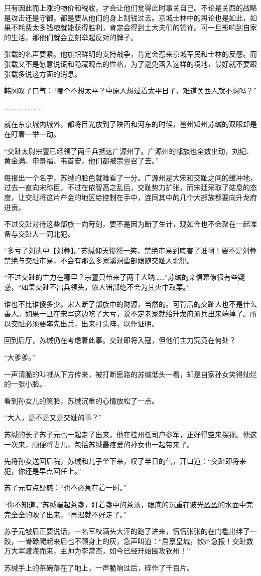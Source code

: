 只有因此而上涨的物价和税收，才会让他们觉得此时事关自己。不论是关西的战略是攻击还是守御，都是要从他们的身上刮钱过去。京城士林中的舆论也是如此，如果不耗费太多钱粮就能获得胜利，肯定会得到士大夫们的赞许。可一旦影响到自家的生活，那他们就会立刻举起反对的牌子。

张载的名声要紧。他旗帜鲜明的支持战争，肯定会惹来京城军民和士林的反感。而张载又不是愿意说谎和隐藏观点的性格，为了避免落入这样的境地，最好就不要跟张载多说这方面的消息。

韩冈叹了口气：“哪个不想太平？中原人想过着太平日子，难道关西人就不想吗？”

……………………

就在东京城内城外，都将目光放到了陕西和河东的时候，邕州知州苏缄的双眼却是在盯着一举一动。

“交趾太尉宗亶已经领了两千兵抵达广源州了。广源州的部族也全数出动，刘纪、黄金满、申景福、韦首安，他们都被宗亶召了去。”

每报出一个名字，苏缄的脸色就难看了一分。广源州是大宋和交趾之间的缓冲地，过去一直向宋称臣，不过在侬智高之乱后，交趾势力扩张，而宋廷采取了姑息的态度，让交趾将这片产金的地区给控制在手中，连同其中的几个大部族都要向升龙府进贡。

不过交趾对待这些部族一向苛刻，要不是因为断了生计，现如今也不会聚在一起准备与交趾人一同北犯。

“多亏了刘执中【刘彝】。”苏缄仰天惨然一笑，禁绝市易到底害了谁啊！要不是刘彝禁绝与交趾市易，不会有那么多家溪洞蛮部跟随交趾人北犯。

“不过交趾的主力在哪里？宗亶只带来了两千人呐……”苏缄的亲信幕僚很有些疑惑，“如果交趾不出兵领头，侬人诸部绝不会为其火中取栗。”

谁也不比谁傻多少。宋人断了部族中的财源，当然的。可背后的交趾人也不是什么善人。如果一旦在宋军这边吃了大亏，说不定老家就给升龙府派兵出来端掉了。所以交趾必须要率先出兵，出来打头阵，以作证明。

回到后厅，苏缄仍在考虑着此事。交趾即将入寇，但他们主力究竟在何处？

“大爹爹。”

一声清脆的叫喊从下方传来，被打断思路的苏缄低头一看，却是自家孙女笑得灿烂的一张小脸。

看到孙女儿的笑脸，苏缄沉重的心情放松了一点。

“大人，是不是又是交趾的事？”

苏缄的长子苏子元也一起走了出来。他在桂州任司户参军，正好得空来探视。他这一次来，顺便将妻儿，包括苏缄最疼爱的孙女也一起带来了。

先将孙女送回后院，苏缄和儿子坐下来，叹了半日的气，开口道：“交趾即将来犯，你还是早点回任上。”

苏子元有点疑惑：“也不必急在着一时。”

“你不知道。”苏缄端起茶盏，盯着盏中的茶汤，眼底的沉重在波光盈盈的水面中完完全全的映了出来，“再迟就不好走了。”

苏子元皱眉正要说话，一名军校满头大汗的跑了进来，慌慌张张的在门槛出绊了一跤，一骨碌爬起来后也不顾身上的灰，急声叫道：“启禀皇城，钦州急报！交趾数万大军渡海而来，主帅为李常杰，如今已经开始围攻钦州！”

苏缄手上的茶碗落在了地上，一声脆响过后，碎作了千百片。

